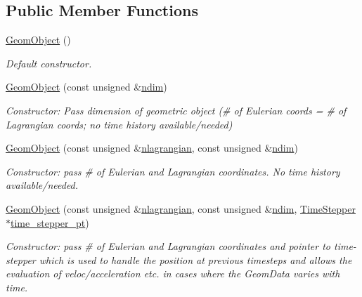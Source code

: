 \subsection*{Public Member Functions}
\begin{DoxyCompactItemize}
\item 
\hyperlink{classoomph_1_1GeomObject_aff5bdabab387795b74ea1df0ab4ef1a6}{Geom\+Object} ()
\begin{DoxyCompactList}\small\item\em Default constructor. \end{DoxyCompactList}\item 
\hyperlink{classoomph_1_1GeomObject_a56cd9cb7bb39ff2c30fb56039be83d31}{Geom\+Object} (const unsigned \&\hyperlink{classoomph_1_1GeomObject_a0305c3102fa6f5042461afb600a082df}{ndim})
\begin{DoxyCompactList}\small\item\em Constructor\+: Pass dimension of geometric object (\# of Eulerian coords = \# of Lagrangian coords; no time history available/needed) \end{DoxyCompactList}\item 
\hyperlink{classoomph_1_1GeomObject_ae3fcf14b1bf5d2bc26f64156baecb7da}{Geom\+Object} (const unsigned \&\hyperlink{classoomph_1_1GeomObject_ae8974ee138b0f879c459340a9f05e06c}{nlagrangian}, const unsigned \&\hyperlink{classoomph_1_1GeomObject_a0305c3102fa6f5042461afb600a082df}{ndim})
\begin{DoxyCompactList}\small\item\em Constructor\+: pass \# of Eulerian and Lagrangian coordinates. No time history available/needed. \end{DoxyCompactList}\item 
\hyperlink{classoomph_1_1GeomObject_a75a091c285c27b4efc14c5afed4d3b31}{Geom\+Object} (const unsigned \&\hyperlink{classoomph_1_1GeomObject_ae8974ee138b0f879c459340a9f05e06c}{nlagrangian}, const unsigned \&\hyperlink{classoomph_1_1GeomObject_a0305c3102fa6f5042461afb600a082df}{ndim}, \hyperlink{classoomph_1_1TimeStepper}{Time\+Stepper} $\ast$\hyperlink{classoomph_1_1GeomObject_a3c92023891dd4a0e818022f467eeb7f1}{time\+\_\+stepper\+\_\+pt})
\begin{DoxyCompactList}\small\item\em Constructor\+: pass \# of Eulerian and Lagrangian coordinates and pointer to time-\/stepper which is used to handle the position at previous timesteps and allows the evaluation of veloc/acceleration etc. in cases where the Geom\+Data varies with time. \end{DoxyCompactList}\item 

\end{DoxyCompactItemize}
